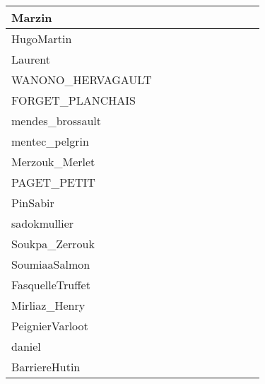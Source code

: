 \documentclass[a4paper]{article}
\begin{document}
\begin{table}[h!]
\begin{tabular}{|l|c|c|c|c|c|c|c|c|c|}
    Marzin                  &       &       &       &       &       &       &       &       &       \\ \hline
    HugoMartin              &       &       &       &       &       &       &       &       &       \\ \hline
    Laurent                 &       &       &       &       &       &       &       &       &       \\ \hline
    WANONO\_HERVAGAULT      &       &       &       &       &       &       &       &       &       \\ \hline
    FORGET\_PLANCHAIS       &       &       &       &       &       &       &       &       &       \\ \hline
    mendes\_brossault       &       &       &       &       &       &       &       &       &       \\ \hline
    mentec\_pelgrin         &       &       &       &       &       &       &       &       &       \\ \hline
    Merzouk\_Merlet         &       &       &       &       &       &       &       &       &       \\ \hline
    PAGET\_PETIT            &       &       &       &       &       &       &       &       &       \\ \hline
    PinSabir                &       &       &       &       &       &       &       &       &       \\ \hline
    sadokmullier            &       &       &       &       &       &       &       &       &       \\ \hline
    Soukpa\_Zerrouk         &       &       &       &       &       &       &       &       &       \\ \hline
    SoumiaaSalmon           &       &       &       &       &       &       &       &       &       \\ \hline
    FasquelleTruffet        &       &       &       &       &       &       &       &       &       \\ \hline
    Mirliaz\_Henry          &       &       &       &       &       &       &       &       &       \\ \hline
    PeignierVarloot         &       &       &       &       &       &       &       &       &       \\ \hline
    daniel                  &       &       &       &       &       &       &       &       &       \\ \hline
    BarriereHutin           &       &       &       &       &       &       &       &       &       \\ \hline

\end{tabular}
\end{table}
\end{document}
